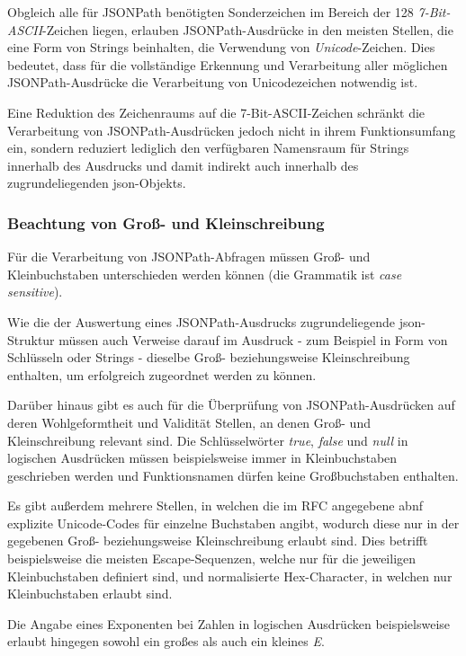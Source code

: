 \documentclass[oneside]{ausarbeitung}
\begin{document}
Obgleich alle für JSONPath benötigten Sonderzeichen im Bereich der 128 \textit{7-Bit-ASCII}-Zeichen liegen, erlauben JSONPath-Ausdrücke in den meisten Stellen, die eine Form von Strings beinhalten, die Verwendung von \textit{Unicode}-Zeichen. Dies bedeutet, dass für die vollständige Erkennung und Verarbeitung aller möglichen JSONPath-Ausdrücke die Verarbeitung von Unicodezeichen notwendig ist.
	
Eine Reduktion des Zeichenraums auf die 7-Bit-ASCII-Zeichen schränkt die Verarbeitung von JSONPath-Ausdrücken jedoch nicht in ihrem Funktionsumfang ein, sondern reduziert lediglich den verfügbaren Namensraum für Strings innerhalb des Ausdrucks und damit indirekt auch innerhalb des zugrundeliegenden \ac{json}-Objekts. 
	
\subsubsection{Beachtung von Groß- und Kleinschreibung}
	
Für die Verarbeitung von JSONPath-Abfragen müssen Groß- und Kleinbuchstaben unterschieden werden können (die Grammatik ist \textit{case sensitive}). 
	
Wie die der Auswertung eines JSONPath-Ausdrucks zugrundeliegende \ac{json}-Struktur müssen auch Verweise darauf im Ausdruck - zum Beispiel in Form von Schlüsseln oder Strings - dieselbe Groß- beziehungsweise Kleinschreibung enthalten, um erfolgreich zugeordnet werden zu können. 
	
Darüber hinaus gibt es auch für die Überprüfung von JSONPath-Ausdrücken auf deren Wohlgeformtheit und Validität Stellen, an denen Groß- und Kleinschreibung relevant sind. Die Schlüsselwörter \textit{true}, \textit{false} und \textit{null} in logischen Ausdrücken müssen beispielsweise immer in Kleinbuchstaben geschrieben werden und Funktionsnamen dürfen keine Großbuchstaben enthalten.
	
Es gibt außerdem mehrere Stellen, in welchen die im RFC angegebene \ac{abnf} explizite Unicode-Codes für einzelne Buchstaben angibt, wodurch diese nur in der gegebenen Groß- beziehungsweise Kleinschreibung erlaubt sind. Dies betrifft beispielsweise die meisten Escape-Sequenzen, welche nur für die jeweiligen Kleinbuchstaben definiert sind, und normalisierte Hex-Character, in welchen nur Kleinbuchstaben erlaubt sind.
	
Die Angabe eines Exponenten bei Zahlen in logischen Ausdrücken beispielsweise erlaubt hingegen sowohl ein großes als auch ein kleines \textit{E}. 
	
\end{document}

